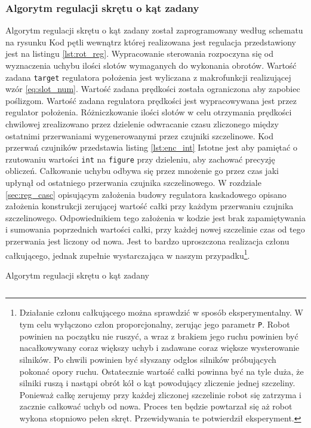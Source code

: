 \documentclass[11pt]{article}
\begin{document}
\subsubsection{Algorytm regulacji skrętu o kąt zadany}
Algorytm regulacji skrętu o kąt zadany został zaprogramowany według schematu na rysunku %
Kod pętli wewnątrz której realizowana jest regulacja przedstawiony jest na listingu \ref{lst:rot_reg}.
Wypracowanie sterowania rozpoczyna się od wyznaczenia uchybu ilości slotów wymaganych do wykonania obrotów.
Wartość zadana \texttt{target} regulatora położenia jest wyliczana z makrofunkcji realizującej wzór \ref{eq:slot_num}.
Wartość zadana prędkości została ograniczona aby zapobiec poślizgom.
Wartość zadana regulatora prędkości jest wypracowywana jest przez regulator położenia.
Różniczkowanie ilości slotów w celu otrzymania prędkości chwilowej zrealizowano przez dzielenie odwracanie czasu zliczonego między ostatnimi przerwaniami wygenerowanymi przez czujniki szczelinowe.
Kod przerwań czujników przedstawia listing \ref{lst:enc_int}
Istotne jest aby pamiętać o rzutowaniu wartości \texttt{int} na \texttt{figure} przy dzieleniu, aby zachować precyzję obliczeń.
Całkowanie uchybu odbywa się przez mnożenie go przez czas jaki upłynął od ostatniego przerwania czujnika szczelinowego.
W rozdziale \ref{sec:reg_casc} opisującym założenia budowy regulatora kaskadowego opisano założenia konstrukcji zerującej wartość całki przy każdym przerwaniu czujnika szczelinowego.
Odpowiednikiem tego założenia w kodzie jest brak zapamiętywania i sumowania poprzednich wartości całki, przy każdej nowej szczelinie czas od tego przerwania jest liczony od nowa.
Jest to bardzo uproszczona realizacja członu całkującego, jednak zupełnie wystarczająca w naszym przypadku\footnote{
	Działanie członu całkującego można sprawdzić w sposób eksperymentalny.
	W tym celu wyłączono człon proporcjonalny, zerując jego parametr \texttt{P}.
	Robot powinien na początku nie ruszyć, a wraz z brakiem jego ruchu powinien być nacałkowywany coraz większy uchyb i zadawane coraz większe wysterowanie silników.
	Po chwili powinien być słyszany odgłos silników próbujących pokonać opory ruchu.
	Ostatecznie wartość całki powinna być na tyle duża, że silniki ruszą i nastąpi obrót kół o kąt powodujący zliczenie jednej szczeliny.
	Ponieważ całkę zerujemy przy każdej zliczonej szczelinie robot się zatrzyma i zacznie całkować uchyb od nowa.
	Proces ten będzie powtarzał się aż robot wykona stopniowo pełen skręt.
	Przewidywania te potwierdził eksperyment.
}.


\begin{listing}[htbp]
\caption{Algorytm regulacji skrętu o kąt zadany}
\inputminted[firstline=85, lastline=126, frame=lines, linenos, breaklines, fontsize=\small]{cpp}{../src/platformMotors.cpp}
\label{lst:rot_reg}
\end{listing}
\end{document}
